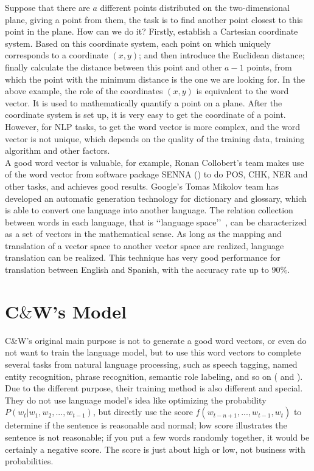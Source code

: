 Suppose that there are $a$ different points distributed on the two-dimensional plane, giving a point from them, the task is to find another point closest to this point in the plane. How can we do it? Firstly, establish a Cartesian coordinate system. Based on this coordinate system, each point on which uniquely corresponds to a coordinate $(x, y)$; and then introduce the Euclidean distance; finally calculate the distance between this point and other $a-1$ points, from which the point with the minimum distance is the one we are looking for. In the above example, the role of the coordinates $(x, y)$ is equivalent to the word vector. It is used to mathematically quantify a point on a plane. After the coordinate system is set up, it is very easy to get the coordinate of a point. However, for NLP tasks, to get the word vector is more complex, and the word vector is not unique, which depends on the quality of the training data, training algorithm and other factors.\\

A good word vector is valuable, for example, Ronan Collobert's team makes use of the word vector from software package SENNA (\citep{collobert2011natural}) to do POS, CHK, NER and other tasks, and achieves good results. Google's Tomas Mikolov team has developed an automatic generation technology for dictionary and glossary, which is able to convert one language into another language. The relation collection between words in each language, that is \lq\lq language space\rq\rq\ , can be characterized as a set of vectors in the mathematical sense.  As long as the mapping and translation of a vector space to another vector space are realized, language translation can be realized. This technique has very good performance for translation between English and Spanish, with the accuracy rate up to $90\%$. 

\section{C$\&$W's Model}

C$\&$W's original main purpose is not to generate a good word vectors, or even do not want to train the language model, but to use this word vectors to complete several tasks from natural language processing, such as speech tagging, named entity recognition, phrase recognition, semantic role labeling, and so on (\citep{collobert2008unified} and \citep{collobert2011natural}). Due to the different purpose, their training method is also different and special. They do not use language model's idea like optimizing the probability $P( w_t| w_1, w_2, ... , w_{t - 1})$, but directly use the score $f( w_{t - n + 1}, ... , w_{t - 1}, w_t)$ to determine if the sentence is reasonable and normal; low score illustrates the sentence is not reasonable; if you put a few words randomly together, it would be certainly a negative score. The score is just about high or low, not business with probabilities. 

